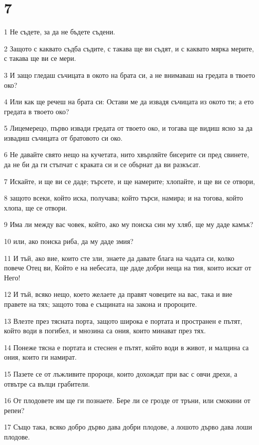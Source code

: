 \chapter{7}

\par 1 Не съдете, за да не бъдете съдени.
\par 2 Защото с каквато съдба съдите, с такава ще ви съдят, и с каквато мярка мерите, с такава ще ви се мери.
\par 3 И защо гледаш съчицата в окото на брата си, а не внимаваш на гредата в твоето око?
\par 4 Или как ще речеш на брата си: Остави ме да извадя съчицата из окото ти; а ето гредата в твоето око?
\par 5 Лицемерецо, първо извади гредата от твоето око, и тогава ще видиш ясно за да извадиш съчицата от братовото си око.
\par 6 Не давайте свято нещо на кучетата, нито хвърляйте бисерите си пред свинете, да не би да ги стъпчат с краката си и се обърнат да ви разкъсат.
\par 7 Искайте, и ще ви се даде; търсете, и ще намерите; хлопайте, и ще ви се отвори,
\par 8 защото всеки, който иска, получава; който търси, намира; и на тогова, който хлопа, ще се отвори.
\par 9 Има ли между вас човек, който, ако му поиска син му хляб, ще му даде камък?
\par 10 или, ако поиска риба, да му даде змия?
\par 11 И тъй, ако вие, които сте зли, знаете да давате блага на чадата си, колко повече Отец ви, Който е на небесата, ще даде добри неща на тия, които искат от Него!
\par 12 И тъй, всяко нещо, което желаете да правят човеците на вас, така и вие правете на тях; защото това е същината на закона и пророците.
\par 13 Влезте през тясната порта, защото широка е портата и пространен е пътят, който води в погибел, и мнозина са ония, които минават през тях.
\par 14 Понеже тясна е портата и стеснен е пътят, който води в живот, и малцина са ония, които ги намират.
\par 15 Пазете се от лъжливите пророци, които дохождат при вас с овчи дрехи, а отвътре са вълци грабители.
\par 16 От плодовете им ще ги познаете. Бере ли се грозде от тръни, или смокини от репеи?
\par 17 Също така, всяко добро дърво дава добри плодове, а лошото дърво дава лоши плодове.
